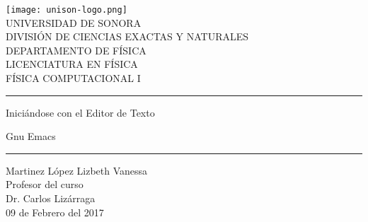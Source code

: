\documentclass[12pt]{article}
\begin{document}
\begin{center}
\texttt{[image: unison-logo.png]}
\\
\vspace{0.5cm}
UNIVERSIDAD DE SONORA \\
\vspace{0.5cm}
DIVISIÓN DE CIENCIAS EXACTAS Y NATURALES \\
\vspace{0.5cm}
DEPARTAMENTO DE FÍSICA\\
\vspace{0.5cm}
LICENCIATURA EN FÍSICA\\
\vspace{0.5cm}
FÍSICA COMPUTACIONAL I

\vspace{2 cm}
\hrule
\vspace{1 cm}

\begin{doublespace}
{\huge \bfseries {Iniciándose con el Editor de Texto 

Gnu Emacs}}
\end{doublespace}

\vspace{1 cm}
\hrule
\vspace{2 cm}
Martinez López Lizbeth Vanessa \\ 
\vspace{1 cm}
Profesor del curso\\
Dr. Carlos Lizárraga\\
\vspace{2 cm}
09 de Febrero del 2017
\end{center}
\pagebreak
\end{document}
